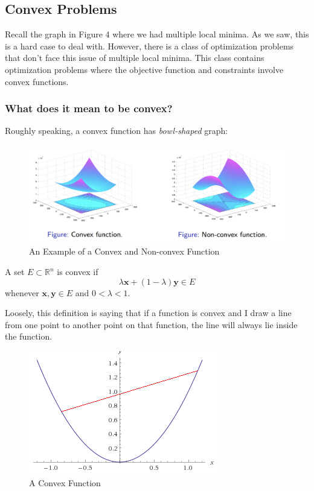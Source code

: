 \documentclass[12pt]{article}
\begin{document}
\subsection{Convex Problems}
Recall the graph in Figure 4 where we had multiple local minima. As we saw, this is a hard case to deal with. However, there is a class of optimization problems that don't face this issue of multiple local minima. This class contains optimization problems where the objective function and constraints involve convex functions. 
\subsubsection{What does it mean to be convex?}
Roughly speaking, a convex function has \textit{bowl-shaped} graph:
\begin{figure}[h!]\begin{center}\includegraphics[scale=0.35]{figures/convex}\caption{An Example of a Convex and Non-convex Function}\end{center}\end{figure}
\begin{definition}
A set $E\subset \mathbb{R}^n$ is convex if $$\lambda\mathbf{x} +(1-\lambda)\mathbf{y}\in E$$ whenever $\mathbf{x},\mathbf{y}\in E$ and $0<\lambda<1$.
\end{definition}
\noindent Loosely, this definition is saying that if a function is convex and I draw a line from one point to another point on that function, the line will always lie inside the function. 
\begin{figure}[h!]\begin{center}\includegraphics[scale=0.45]{figures/convfunc}\caption{A Convex Function}\end{center}\end{figure}
\end{document}
